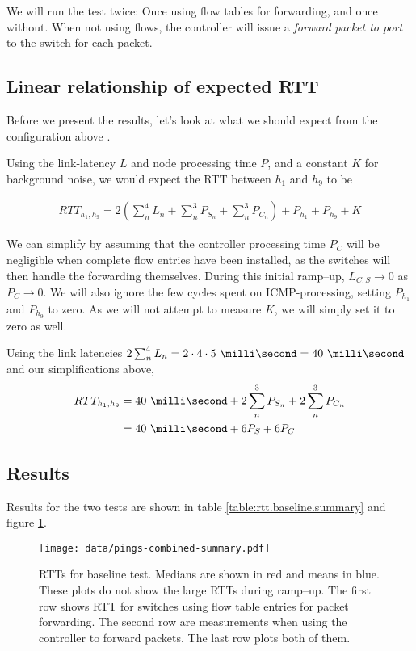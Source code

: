 We will run the test twice: Once using flow tables for forwarding, and once
without.  When not using flows, the controller will issue a \textit{forward
packet to port} to the switch for each packet.

\subsection{Linear relationship of expected \acs{RTT}}

Before we present the results, let's look at what we should expect from the
configuration above \cite{DBLP:conf/cnsm/PhemiusB13}.

Using the link-latency $L$ and node processing time $P$, and a constant $K$
for background noise, we would expect the \acf{RTT} between $h_1$ and $h_9$
to be

\begin{gather}
  RTT_{h_1, h_9} = 2\left( \sum_n^4 L_n + \sum_n^3 P_{S_n} + \sum_n^3 P_{C_n} \right) + P_{h_1} + P_{h_9} + K
  \label{equation:baseline.rtt}
\end{gather}

We can simplify by assuming that the controller processing time $P_C$ will
be negligible when complete flow entries have been installed, as the
switches will then handle the forwarding themselves.  During this initial
ramp--up, $L_{C,S} \to 0$ as $P_C \to 0$.  We will also ignore the few
cycles spent on ICMP-processing, setting $P_{h_1}$ and $P_{h_9}$ to zero.
As we will not attempt to measure $K$, we will simply set it to zero as
well.

Using the link latencies $2\sum_n^4 L_n = 2\cdot4\cdot\ms{5} = \ms{40}$
and our simplifications above,
\begin{align}
  RTT_{h_1,h_9} &= \ms{40} + 2\sum_n^3 P_{S_n} + 2\sum_n^3 P_{C_n} \\
                &= \ms{40} + 6P_S + 6P_C
  \label{equation:expected.baseline.rtt}
\end{align}

\subsection{Results}

Results for the two tests are shown in table
\ref{table:rtt.baseline.summary} and figure
\ref{figure:baseline.combined.summary.plot}.

\begin{figure}
  \centering
  \texttt{[image: data/pings-combined-summary.pdf]}
  \caption{\acs{RTT}s for baseline test.  Medians are shown in red and means
    in blue.
    These plots do not show the large \acs{RTT}s during ramp--up.
    The first row shows \acs{RTT} for switches using flow table entries for
    packet forwarding.  The second row are measurements when using the
    controller to forward packets.  The last row plots both of them.}
  \label{figure:baseline.combined.summary.plot}
\end{figure}

